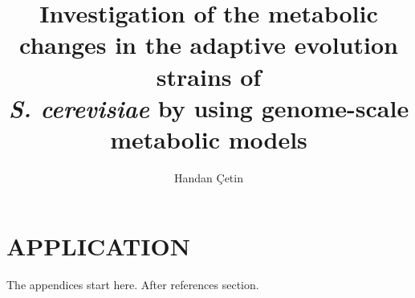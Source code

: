 \documentclass[a4paper,onesided,12pt]{report}
\title{Investigation of the metabolic changes in the adaptive evolution strains of \\
\emph{S. cerevisiae} by using genome-scale metabolic models}
\author{Handan Çetin}
\begin{document}

%







% 

% 
% 
% 





\appendix
\chapter{APPLICATION}
The appendices start here. After references section.
\end{document}
